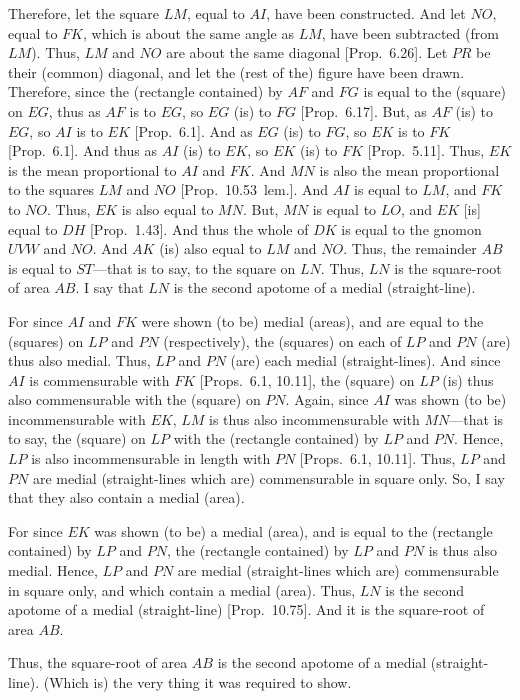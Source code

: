 \begin{Parallel}{}{}
{Therefore, let the square $LM$, equal to $AI$, have been constructed. And
let $NO$, equal to $FK$, which is about the same angle as $LM$, have
been subtracted (from $LM$). Thus, $LM$ and $NO$ are about the same
diagonal [Prop.~6.26]. Let $PR$ be their (common) diagonal,
and let the (rest of the) figure have been drawn. Therefore, since
the (rectangle contained) by $AF$ and $FG$ is equal to the (square) on
$EG$, thus as $AF$ is to $EG$, so $EG$ (is) to $FG$
[Prop.~6.17]. But, as $AF$ (is) to $EG$, so
$AI$ is to $EK$ [Prop.~6.1]. And as $EG$ (is)
to $FG$, so $EK$ is to $FK$ [Prop.~6.1]. And thus
as $AI$ (is) to $EK$, so $EK$ (is) to $FK$ [Prop.~5.11]. Thus, $EK$
is the mean proportional to $AI$ and $FK$. And $MN$ is also the
mean proportional to the squares $LM$ and $NO$ [Prop.~10.53~lem.]. And $AI$
is equal to $LM$, and $FK$ to $NO$. Thus, $EK$ is also equal to $MN$.
But, $MN$ is equal to $LO$, and $EK$ [is] equal to $DH$ [Prop.~1.43]. And thus the whole
of $DK$ is equal to the gnomon $UVW$ and $NO$. And $AK$ (is) also
equal to $LM$ and $NO$. Thus, the remainder $AB$ is equal to $ST$---that 
is to say, to the square on $LN$. Thus, $LN$ is the square-root of area $AB$.
I say that $LN$ is the second apotome of a medial (straight-line).

For since $AI$ and $FK$ were shown (to be)
medial (areas), and are equal to the (squares) on $LP$ and $PN$ (respectively), the (squares) on each of $LP$ and $PN$ (are) thus also
medial. Thus, $LP$ and $PN$ (are) each medial (straight-lines).
And since $AI$ is commensurable with $FK$ [Props.~6.1, 10.11], the (square) on $LP$
(is) thus also commensurable with the (square) on $PN$.  Again, since
$AI$ was shown (to be) incommensurable with $EK$, $LM$ is thus
also incommensurable with $MN$---that is to say, the (square) on 
$LP$ with the (rectangle contained) by $LP$ and $PN$.
Hence, $LP$ is also incommensurable in length with $PN$ [Props.~6.1, 10.11]. Thus, $LP$ and $PN$
are medial (straight-lines which are) commensurable in square only.
So, I say that they also contain a medial (area).

For since $EK$ was shown (to be) a medial (area), and is equal to the
(rectangle contained) by $LP$ and $PN$, the (rectangle contained) by
$LP$ and $PN$ is thus also medial. Hence, $LP$ and $PN$
are medial (straight-lines which are) commensurable in square only, and
which contain a medial (area). Thus, $LN$ is the
second apotome of a medial (straight-line) [Prop.~10.75]. And it is the square-root of area
$AB$.

Thus, the square-root of area $AB$ is the second apotome of a medial (straight-line). (Which is) the very thing it was required to show.}
\end{Parallel}

